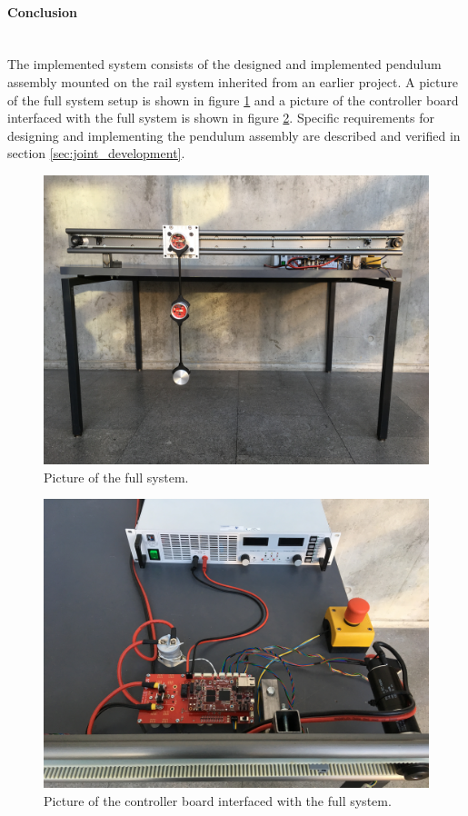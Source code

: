 \paragraph{Conclusion}~\\
The implemented system consists of the designed and implemented pendulum assembly mounted on the rail system inherited from an earlier project.
A picture of the full system setup is shown in figure \ref{fig:pic_full_system} and a picture of the controller board interfaced with the full system is shown in figure \ref{fig:pic_full_system_high}.
Specific requirements for designing and implementing the pendulum assembly are described and verified in section \ref{sec:joint_development}. 
\begin{figure}
	\centering
	\includegraphics[width=.9\linewidth]{graphics/full_system_finish.JPG}
	\caption{Picture of the full system.}
	\label{fig:pic_full_system}
\end{figure}
\begin{figure}
	\centering
	\includegraphics[width=.9\linewidth]{graphics/full_system_finish_high.JPG}
	\caption{Picture of the controller board interfaced with the full system.}
	\label{fig:pic_full_system_high}
\end{figure}


